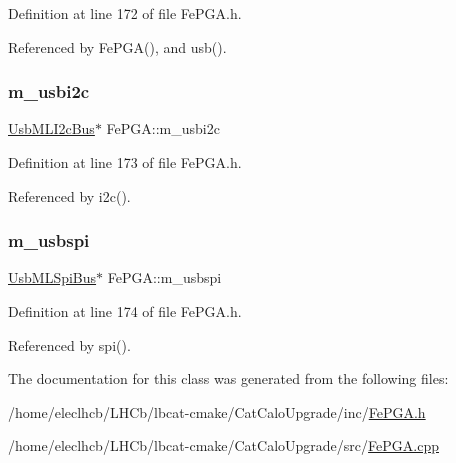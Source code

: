 Definition at line 172 of file Fe\+P\+G\+A.\+h.



Referenced by Fe\+P\+G\+A(), and usb().

\mbox{\label{classFePGA_a09fdde4002008daa0d15672772dd4483}} 
\subsubsection{\texorpdfstring{m\+\_\+usbi2c}{m\_usbi2c}}
{\footnotesize\ttfamily \hyperlink{classUsbMLI2cBus}{Usb\+M\+L\+I2c\+Bus}$\ast$ Fe\+P\+G\+A\+::m\+\_\+usbi2c\hspace{0.3cm}{\ttfamily [private]}}



Definition at line 173 of file Fe\+P\+G\+A.\+h.



Referenced by i2c().

\mbox{\label{classFePGA_a922a56250b29c9842cdb8095cae8c976}} 
\subsubsection{\texorpdfstring{m\+\_\+usbspi}{m\_usbspi}}
{\footnotesize\ttfamily \hyperlink{classUsbMLSpiBus}{Usb\+M\+L\+Spi\+Bus}$\ast$ Fe\+P\+G\+A\+::m\+\_\+usbspi\hspace{0.3cm}{\ttfamily [private]}}



Definition at line 174 of file Fe\+P\+G\+A.\+h.



Referenced by spi().



The documentation for this class was generated from the following files\+:\begin{DoxyCompactItemize}
\item 
/home/eleclhcb/\+L\+H\+Cb/lbcat-\/cmake/\+Cat\+Calo\+Upgrade/inc/\hyperlink{FePGA_8h}{Fe\+P\+G\+A.\+h}\item 
/home/eleclhcb/\+L\+H\+Cb/lbcat-\/cmake/\+Cat\+Calo\+Upgrade/src/\hyperlink{FePGA_8cpp}{Fe\+P\+G\+A.\+cpp}\end{DoxyCompactItemize}

